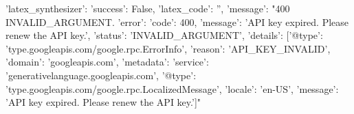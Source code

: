 {'latex_synthesizer': {'success': False, 'latex_code': '', 'message': "400 INVALID_ARGUMENT. {'error': {'code': 400, 'message': 'API key expired. Please renew the API key.', 'status': 'INVALID_ARGUMENT', 'details': [{'@type': 'type.googleapis.com/google.rpc.ErrorInfo', 'reason': 'API_KEY_INVALID', 'domain': 'googleapis.com', 'metadata': {'service': 'generativelanguage.googleapis.com'}}, {'@type': 'type.googleapis.com/google.rpc.LocalizedMessage', 'locale': 'en-US', 'message': 'API key expired. Please renew the API key.'}]}}"}}
